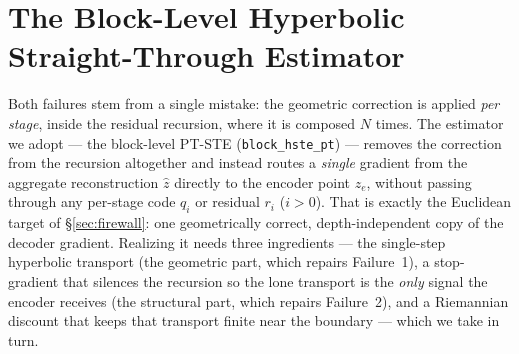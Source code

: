 \documentclass[12pt]{report}
\begin{document}
\section{The Block-Level Hyperbolic Straight-Through Estimator}
\label{sec:hste}
\label{sec:blockste}
Both failures stem from a single mistake: the geometric correction is applied \emph{per stage}, inside the residual recursion, where it is composed $N$ times. The estimator we adopt --- the block-level PT-STE (\texttt{block\_hste\_pt}) --- removes the correction from the recursion altogether and instead routes a \emph{single} gradient from the aggregate reconstruction $\hat z$ directly to the encoder point $z_e$, without passing through any per-stage code $q_i$ or residual $r_i$ ($i>0$). That is exactly the Euclidean target of \S\ref{sec:firewall}: one geometrically correct, depth-independent copy of the decoder gradient. Realizing it needs three ingredients --- the single-step hyperbolic transport (the geometric part, which repairs Failure~1), a stop-gradient that silences the recursion so the lone transport is the \emph{only} signal the encoder receives (the structural part, which repairs Failure~2), and a Riemannian discount that keeps that transport finite near the boundary --- which we take in turn.
\end{document}
